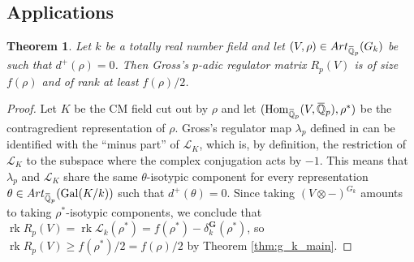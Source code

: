\documentclass[12pt]{amsart}
\newcommand{\Q}{\mathbb{Q}}
\newcommand\bQ{\mathbb{Q}}
\newcommand\sL{\mathscr{L}}
\newcommand{\ob}[1]{\mkern 1.5mu\overline{\mkern-1.5mu#1\mkern-1.5mu}\mkern 1.5mu}
\newcommand{\Art}{\textrm{Art}}
\DeclareMathOperator{\Gal}{Gal}
\DeclareMathOperator{\Hom}{Hom}
\DeclareMathOperator{\rk}{rk}
\theoremstyle{defstyle}
\theoremstyle{thmstyle}
\newtheorem{theorem}[subsubsection]{Theorem}
\begin{document}
	\subsection{Applications}
	\begin{theorem}
		Let $k$ be a totally real number field and let $(V,\rho)\in \Art_{\ob{\Q}_p}(G_k)$ be such that $d^+(\rho)=0$. Then Gross's $p$-adic regulator matrix $R_p(V)$ \cite[(2.10)]{gross1981padic} is of size $f(\rho)$ and of rank at least $ f(\rho)/2$.
	\end{theorem}
	\begin{proof}
		Let $K$ be the CM field cut out by $\rho$ and let $(\Hom_{\ob{\Q}_p}(V,\ob{\Q}_p),\rho^*)$ be the contragredient representation of $\rho$. Gross's regulator map $\lambda_p$ defined in \cite[(1.18)]{gross1981padic} can be identified with the ``minus part'' of $\sL_K$, which is, by definition, the restriction of $\sL_K$ to the subspace where the complex conjugation acts by $-1$. This means that $\lambda_p$ and $\sL_K$ share the same $\theta$-isotypic component for every representation $\theta\in \Art_{\ob{\bQ}_p}(\Gal(K/k))$ such that $d^+(\theta)=0$. Since taking $(V \otimes -)^{G_k}$ amounts to taking $\rho^*$-isotypic components, we conclude that $\rk R_p(V)=\rk \sL_k(\rho^*)=f(\rho^*)-\delta^\textbf{G}_k(\rho^*)$, so $\rk R_p(V)\geq f(\rho^*)/2=f(\rho)/2$ by Theorem \ref{thm:g_k_main}.
	\end{proof}
	
\end{document}
